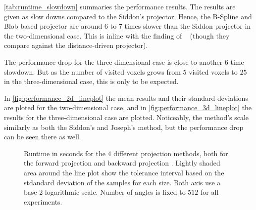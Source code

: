\autoref{tab:runtime_slowdown} summaries the performance results. The results are given as slow
downs compared to the Siddon's projector. Hence, the B-Spline and Blob based projector are around
\(6\) to \(7\) times slower than the Siddon projector in the two-dimensional case. This is inline
with the finding of \citeauthor*{momey_b-spline_2012}~\cite{momey_b-spline_2012} (though they
compare against the distance-driven projector).

The performance drop for the three-dimensional case is close to another \(6\) time slowdown. But as
the number of visited voxels grows from \(5\) visited voxels to \(25\) in the three-dimensional
case, this is only to be expected.

In \autoref{fig:performance_2d_lineplot} the mean results and their standard deviations are ploted
for the two-dimensional case, and in \autoref{fig:performance_3d_lineplot} the results for the
three-dimensional case are plotted. Noticeably, the method's scale similarly as both the Siddon's
and Joseph's method, but the performance drop can be seen there as well.

\begin{figure}
	\centering


	\caption{Runtime in seconds for the 4 different projection methods, both for the forward
		projection  and backward
		projection . Lightly shaded area around
		the line plot show the tolerance interval based on the stdandard deviation of the
		samples for each size. Both axis use a base 2 logarithmic scale. Number of angles is
		fixed to \(512\) for all experiments.}%
	\label{fig:performance_2d_lineplot}
\end{figure}

